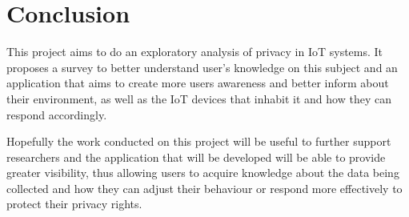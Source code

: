 %
%
\section{Conclusion}

This project aims to do an exploratory analysis of privacy in IoT systems.
It proposes a survey to better understand user's knowledge on this subject
and an application that aims to create more users awareness and better inform
about their environment, as well as the IoT devices that inhabit it and
how they can respond accordingly.


Hopefully the work conducted on this project will be useful to further support
researchers and the application that will be developed will be able to
provide greater visibility, thus allowing users to acquire knowledge about
the data being collected and how they can adjust their behaviour or respond
more effectively to protect their privacy rights.
